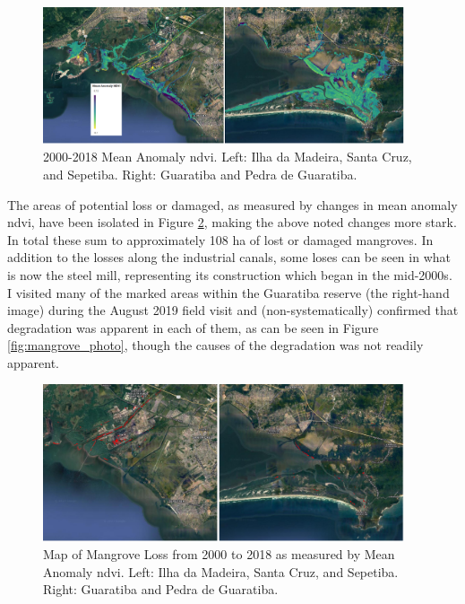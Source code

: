 \begin{figure}[!htb] 
\centering
\includegraphics[width=0.95\textwidth]{Figures/chap4/mean_anomaly_map.png}
\caption[2000-2018 Mean Anomaly NDVI of Region]{2000-2018 Mean Anomaly \ac{ndvi}. Left: Ilha da Madeira, Santa Cruz, and Sepetiba. Right: Guaratiba and Pedra de Guaratiba.}
\label{fig:mean_anomaly_map}
\end{figure}

The areas of potential loss or damaged, as measured by changes in mean anomaly \ac{ndvi}, have been isolated in Figure \ref{fig:loss_map}, making the above noted changes more stark. In total these sum to approximately 108 ha of lost or damaged mangroves. In addition to the losses along the industrial canals, some loses can be seen in what is now the steel mill, representing its construction which began in the mid-2000s.  I visited many of the marked areas within the Guaratiba reserve (the right-hand image) during the August 2019 field visit and (non-systematically) confirmed that degradation was apparent in each of them, as can be seen in Figure \ref{fig:mangrove_photo}, though the causes of the degradation was not readily apparent.

\begin{figure}[!htb] 
\centering
\includegraphics[width=0.95\textwidth]{Figures/chap4/loss_map.png}
\caption[Map of Mangrove Loss]{Map of Mangrove Loss from 2000 to 2018 as measured by Mean Anomaly \ac{ndvi}. Left: Ilha da Madeira, Santa Cruz, and Sepetiba. Right: Guaratiba and Pedra de Guaratiba.}
\label{fig:loss_map}
\end{figure}

